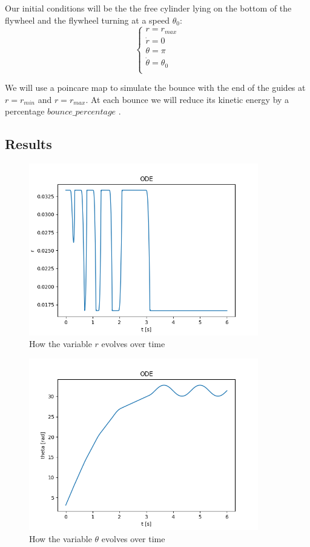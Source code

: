 Our initial conditions will be the the free cylinder lying on the bottom of the flywheel and the flywheel turning at a speed $\theta_0$:
\[
    \begin{cases}
        r = r_{max} \\
        \dot{r} = 0\\
        \theta = \pi\\
        \dot{\theta} = \theta_0\\
    \end{cases}
\]

We will use a poincare map to simulate the bounce with the end of the guides at $r=r_{min}$ and $r=r_{max}$. At each bounce we will reduce its kinetic energy by a percentage $bounce\_percentage$ .

\subsection{Results}

\begin{figure}[ht]
	\centering
	\includegraphics[width=10cm]{img/simulation/r_t.png}
	\caption{How the variable $r$ evolves over time}
	\label{fig:r t diagram}
\end{figure}

\begin{figure}[ht]
	\centering
	\includegraphics[width=10cm]{img/simulation/theta_t.png}
	\caption{How the variable $\theta$ evolves over time}
	\label{fig:theta t diagram}
\end{figure}

